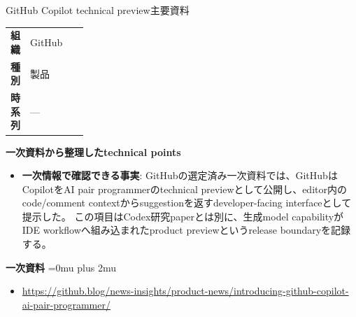 \begin{technicalnote}{GitHub Copilot technical preview}{主要資料}
\begingroup
\begin{tabularx}{\linewidth}{@{}>{\bfseries}p{0.22\linewidth}X@{}}
組織 & GitHub \\
種別 & 製品 \\
時系列 & — \\
\end{tabularx}
\smallskip
{\bfseries 一次資料から整理したtechnical points}
\begin{itemize}[leftmargin=1.5em,itemsep=0.35em]
\item \textbf{一次情報で確認できる事実}: GitHubの選定済み一次資料では、GitHubはCopilotをAI pair programmerのtechnical previewとして公開し、editor内のcode/comment contextからsuggestionを返すdeveloper-facing interfaceとして提示した。 この項目はCodex研究paperとは別に、生成model capabilityがIDE workflowへ組み込まれたproduct previewというrelease boundaryを記録する。
\end{itemize}
\begin{minipage}{\linewidth}
\begin{samepage}
{\bfseries 一次資料}
\begingroup\sloppy
\Urlmuskip=0mu plus 2mu\relax
\begin{itemize}[leftmargin=1.5em,itemsep=0.25em]
\item {\scriptsize\url{https://github.blog/news-insights/product-news/introducing-github-copilot-ai-pair-programmer/}}
\end{itemize}
\endgroup
\end{samepage}
\end{minipage}
\endgroup
\end{technicalnote}
\medskip
